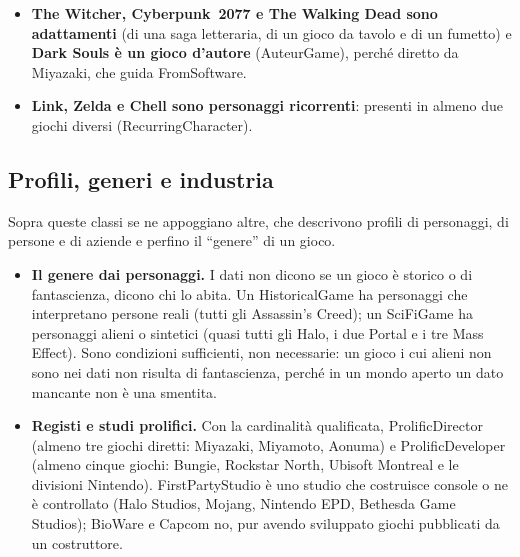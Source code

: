 \documentclass[10pt,a4paper]{article}
\newcommand{\cls}[1]{\textsf{#1}}
\begin{document}
\begin{itemize}
  \item \textbf{The Witcher, Cyberpunk~2077 e The Walking Dead sono adattamenti} (di una saga letteraria, di un gioco da tavolo e di un fumetto) e \textbf{Dark Souls è un gioco d'autore} (\cls{AuteurGame}), perché diretto da Miyazaki, che guida FromSoftware.
  \item \textbf{Link, Zelda e Chell sono personaggi ricorrenti}: presenti in almeno due giochi diversi (\cls{RecurringCharacter}).
\end{itemize}

\subsection{Profili, generi e industria}
Sopra queste classi se ne appoggiano altre, che descrivono profili di personaggi, di persone e di aziende e perfino il ``genere'' di un gioco.
\begin{itemize}
  \item \textbf{Il genere dai personaggi.} I dati non dicono se un gioco è storico o di fantascienza, dicono chi lo abita. Un \cls{HistoricalGame} ha personaggi che interpretano persone reali (tutti gli Assassin's Creed); un \cls{SciFiGame} ha personaggi alieni o sintetici (quasi tutti gli Halo, i due Portal e i tre Mass Effect). Sono condizioni sufficienti, non necessarie: un gioco i cui alieni non sono nei dati non risulta di fantascienza, perché in un mondo aperto un dato mancante non è una smentita.
  \item \textbf{Registi e studi prolifici.} Con la cardinalità qualificata, \cls{ProlificDirector} (almeno tre giochi diretti: Miyazaki, Miyamoto, Aonuma) e \cls{ProlificDeveloper} (almeno cinque giochi: Bungie, Rockstar North, Ubisoft Montreal e le divisioni Nintendo). \cls{FirstPartyStudio} è uno studio che costruisce console o ne è controllato (Halo Studios, Mojang, Nintendo EPD, Bethesda Game Studios); BioWare e Capcom no, pur avendo sviluppato giochi pubblicati da un costruttore.
\end{itemize}
\end{document}
